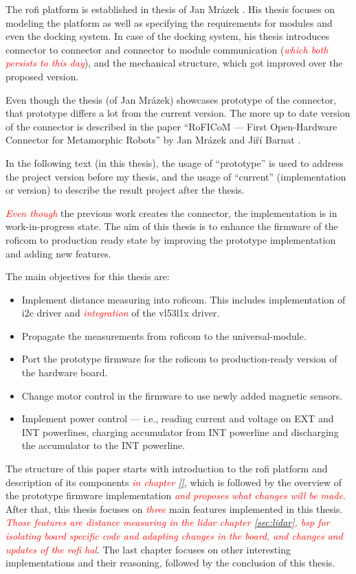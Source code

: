 \documentclass[
  digital,     %
  oneside,     %
  nosansbold,  %
  nocolorbold, %
  lof,         %
  lot,         %
]{fithesis4}
\newcommand{\TODO}[1]{\textcolor{red}{\textit{#1}}}
\begin{document}
The \acrshort{rofi} platform is established in thesis of Jan Mrázek \cite{Mrazek2019thesis}. His thesis focuses on modeling the platform as well as specifying the requirements for modules and even the docking system. In case of the docking system, his thesis introduces connector to connector and connector to module communication (\TODO{which both persists to this day}), and the mechanical structure, which got improved over the proposed version.

Even though the thesis (of Jan Mrázek) showcases prototype of the connector, that prototype differs a lot from the current version. The more up to date version of the connector is described in the paper ``RoFICoM --- First Open-Hardware Connector for Metamorphic Robots'' by Jan Mrázek and Jiří Barnat \cite{MrazekBarnat2019Roficom}.

In the following text (in this thesis), the usage of ``prototype'' is used to address the project version before my thesis, and the usage of ``current'' (implementation or version) to describe the result project after the thesis.

\TODO{Even though} the previous work creates the connector, the implementation is in work-in-progress state. The aim of this thesis is to enhance the firmware of the \acrshort{roficom} to production ready state by improving the prototype implementation and adding new features.

The main objectives for this thesis are:
\begin{itemize}
    \item Implement distance measuring into \acrshort{roficom}. This includes implementation of \acrshort{i2c} driver and \TODO{integration} of the \gls{vl53l1x} driver.
    \item Propagate the measurements from \acrshort{roficom} to the \gls{universal-module}. 
    \item Port the prototype firmware for the \acrshort{roficom} to production-ready version of the hardware board.
    \item Change motor control in the firmware to use newly added magnetic sensors.
    \item Implement power control --- i.e., reading current and voltage on EXT and INT powerlines, charging accumulator from INT powerline and discharging the accumulator to the INT powerline.
\end{itemize}

The structure of this paper starts with introduction to the \acrshort{rofi} platform and description of its components \TODO{in chapter \ref{}}, which is followed by the overview of the prototype firmware implementation \TODO{and proposes what changes will be made}. After that, this thesis focuses on \TODO{three} main features implemented in this thesis. \TODO{Those features are distance measuring in the \acrshort{lidar} chapter \ref{sec:lidar}, \acrlong{bsp} for isolating board specific code and adapting changes in the board, and changes and updates of the \acrshort{rofi} \acrlong{hal}}. The last chapter focuses on other interesting implementations and their reasoning, followed by the conclusion of this thesis.
\end{document}
